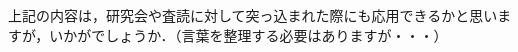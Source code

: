 \documentclass[16.7pt]{jsarticle}
\begin{document}
	上記の内容は，研究会や査読に対して突っ込まれた際にも応用できるかと思いますが，いかがでしょうか．（言葉を整理する必要はありますが・・・）

\end{document}
